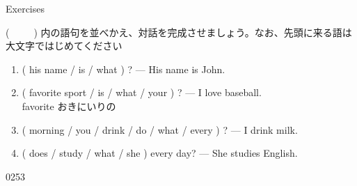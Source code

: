 \documentclass[aspectratio=169,xcolor={dvipsnames,table}]{beamer}
\begin{document}
\begin{frame}[plain]{Exercises}
 

(~~~~~) 内の語句を並べかえ、対話を完成させましょう。なお、先頭に来る語は大文字ではじめてください
\begin{enumerate}
 \item ( his name / is / what ) ? --- His name is John.\\
 \item ( favorite sport / is / what / your ) ? --- I love baseball.\\
\hfill{\scriptsize favorite  おきにいりの}
 \item ( morning / you / drink / do / what / every ) ? --- I drink milk.\\
 \item ( does / study / what / she ) every day? --- She studies English.\\
\end{enumerate}

\mbox{}\hfill{\tiny 0253}\,{\scriptsize {}}

\end{frame}
\end{document}
